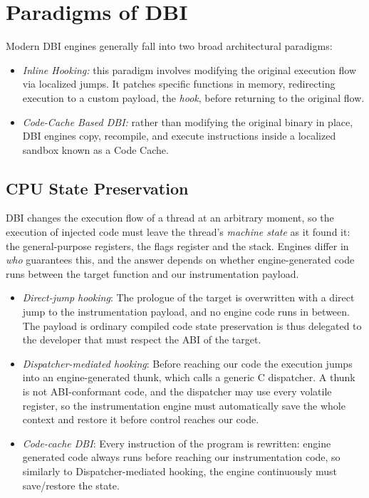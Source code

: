 \section{Paradigms of DBI}

Modern \ac{DBI} engines generally fall into two broad architectural paradigms:
\begin{itemize}
	\item \emph{Inline Hooking:} this paradigm involves modifying the original execution flow via localized jumps.
	It patches specific functions in memory, redirecting execution to a custom payload, the \emph{hook}, before returning to the original flow.
	\item \emph{Code-Cache Based \ac{DBI}:} rather than modifying the original binary in place, \ac{DBI} engines copy, recompile, and execute instructions inside a localized sandbox known as a Code Cache.
\end{itemize}

\subsection{CPU State Preservation}
\label{subsec:state_pres}
\ac{DBI} changes the execution flow of a thread at an arbitrary moment, so the execution of injected code must leave the thread's \emph{machine state} as it found it: the general-purpose registers, the flags register and the stack.
Engines differ in \emph{who} guarantees this, and the answer depends on whether engine-generated code runs between the target function and our instrumentation payload.
\begin{itemize}
	\item \emph{Direct-jump hooking}: The prologue of the target is overwritten with a direct jump to the instrumentation payload, and no engine code runs in between. The payload is ordinary compiled code state preservation is thus delegated to the developer that must respect the \ac{ABI} of the target.
	\item \emph{Dispatcher-mediated hooking}: Before reaching our code the execution jumps into an engine-generated thunk, which calls a generic C dispatcher. A thunk is not \ac{ABI}-conformant code, and the dispatcher may use every volatile register, so the instrumentation engine must automatically save the whole context and restore it before control reaches our code.
	\item \emph{Code-cache \ac{DBI}}: Every instruction of the program is rewritten: engine generated code always runs before reaching our instrumentation code, so similarly to Dispatcher-mediated hooking, the engine continuously must save/restore the state.
\end{itemize}

